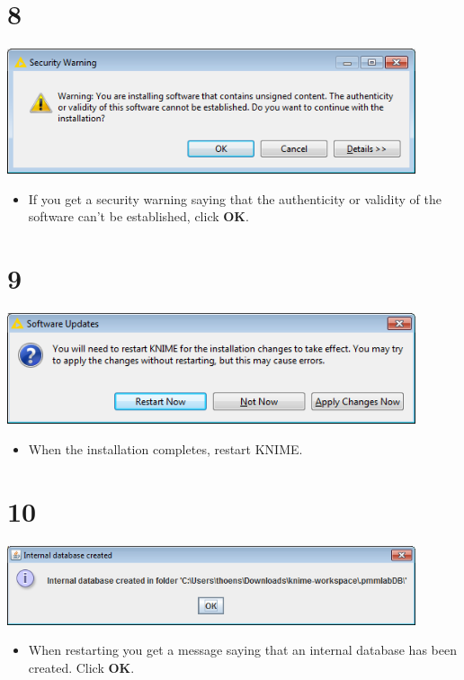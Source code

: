 \documentclass{beamer}
\begin{document}
\section{8}
\begin{frame}
	\begin{center}
  		\includegraphics[width=0.9\textwidth]{8.png}
	\end{center}
	\begin{itemize}
		\item If you get a security warning saying that the authenticity or validity of the software can't be established, click \textbf{OK}.
	\end{itemize}
\end{frame}

\section{9}
\begin{frame}
	\begin{center}
  		\includegraphics[width=0.9\textwidth]{9.png}
	\end{center}
	\begin{itemize}
		\item When the installation completes, restart KNIME.
	\end{itemize}
\end{frame}

\section{10}
\begin{frame}
	\begin{center}
  		\includegraphics[width=0.9\textwidth]{10.png}
	\end{center}
	\begin{itemize}
		\item When restarting you get a message saying that an internal database has been created. Click \textbf{OK}.
	\end{itemize}
\end{frame}
\end{document}
